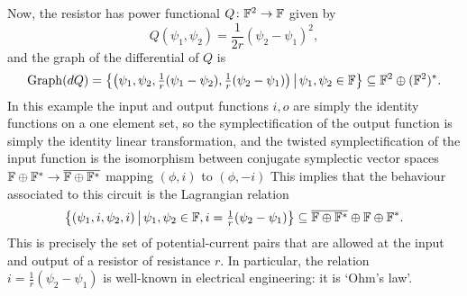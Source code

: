 Now, the resistor has power functional $Q{\colon} {\mathbb F}^2 \to {\mathbb F}$ given by
\[   Q(\psi_1,\psi_2) = \frac1{2r}(\psi_2-\psi_1)^2, \]
and the graph of the differential of $Q$ is
\[
  \mathrm{Graph}(dQ) = \big\{\big(\psi_1,\psi_2,
  \tfrac1r(\psi_1-\psi_2),\tfrac1r(\psi_2-\psi_1)\big) \,\big|\, \psi_1,\psi_2 \in
  {\mathbb F}\big\} \subseteq {\mathbb F}^2 \oplus ({\mathbb F}^2)^\ast.
\]
In this example the input and output functions $i,o$ are simply the identity
functions on a one element set, so the symplectification of the output function
is simply the identity linear transformation, and the twisted symplectification
of the input function is the isomorphism  between conjugate
symplectic vector spaces ${\mathbb F}\oplus{\mathbb F}^\ast \to \overline{{\mathbb F}\oplus{\mathbb F}^\ast}$ mapping $(\phi,i)$ to $(\phi,-i)$ This implies that the behaviour associated to this
circuit is the Lagrangian relation
\[
  \big\{(\psi_1,i,\psi_2,i) \,\big|\, \psi_1,\psi_2 \in {\mathbb F}, i =
  \tfrac1r(\psi_2-\psi_1)\big\}\subseteq \overline{{\mathbb F} \oplus {\mathbb F}^\ast} \oplus {\mathbb F}
    \oplus {\mathbb F}^\ast.
\]
This is precisely the set of potential-current pairs that are allowed at the
input and output of a resistor of resistance $r$.  In particular, the relation
$i = \tfrac1r(\psi_2-\psi_1)$ is well-known in electrical engineering: it is
`Ohm's law'.

